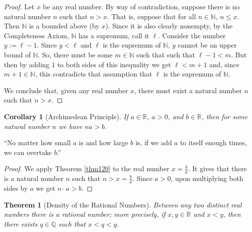 \documentclass[12pt]{amsart}
\newcommand{\Q}{\mathbb{Q}}
\newcommand{\R}{{\mathbb{R}}}
\newcommand{\N}{\mathbb{N}}
\numberwithin{equation}{section}
\theoremstyle{plain} %
\newtheorem{thm}[equation]{Theorem}
\newtheorem{cor}[equation]{Corollary}
\theoremstyle{definition}
\theoremstyle{remark}
\begin{document}
\begin{proof} Let $x$ be any real number. By way of contradiction, suppose there is no natural number $n$ such that $n > x$. That is, suppose that for all $n \in
  \N$, $n \leq x$. Then $\N$ is a bounded above (by $x$). Since it is also clearly nonempty,  by the Completeness
  Axiom, $\N$ has a supremum, call it $\ell$. Consider the number $y := \ell- 1$. Since $y < \ell$ and $\ell$ is the supremum of $\N$,  
$y$ cannot be an upper bound of $\N$. So, there must be some $m \in \N$
  such that such that $\ell-1 < m$. But then by adding $1$ to both sides of this inequality we get $\ell < m+1$ and, 
since $m + 1 \in \N$, this contradicts that assumption that $\ell$ is the supremum of $\N$. 

We conclude that, given any real number $x$,  there must exist a natural number  $n$ such that $n > x$.
\end{proof}

\begin{cor}[Archimedean Principle] If $a \in \R$, $a >0$, and $b \in \R$, then for some natural number $n$ we have $na > b$.
\end{cor}


``No matter how small $a$ is and how large $b$ is, if we add $a$ to itself enough times, we can overtake $b$.''

\begin{proof} We apply Theorem \ref{thm120} to the real number $x = \frac{b}{a}$. It gives that 
  there is a natural number $n$ such that $n > x = \frac{b}{a}$. Since $a > 0$, upon multiplying both sides
  by $a$ we get $n \cdot a  > b$.
\end{proof}

\begin{thm}[Density of the Rational Numbers] 
Between any two distinct  real numbers there is a rational number; more precisely, if $x, y \in \R$ and $x < y$, then there
  exists $q \in \Q$ such that $x < q < y$.
\end{thm}
\end{document}
